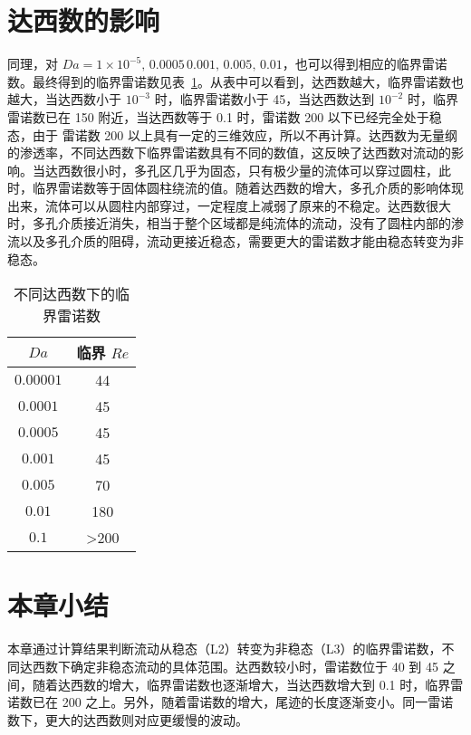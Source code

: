 \section{达西数的影响}\label{sec: Da}

同理，对 $Da=1\times 10^{-5},\,0.0005\,0.001,\,0.005,\,0.01$，也可以得到相应的临界雷诺数。最终得到的临界雷诺数见表~\ref{tab: critical Re}。从表中可以看到，达西数越大，临界雷诺数也越大，当达西数小于 $10^{-3}$ 时，临界雷诺数小于 45，当达西数达到 $10^{-2}$ 时，临界雷诺数已在 150 附近，当达西数等于 0.1 时，雷诺数 200 以下已经完全处于稳态，由于 雷诺数 200 以上具有一定的三维效应，所以不再计算。达西数为无量纲的渗透率，不同达西数下临界雷诺数具有不同的数值，这反映了达西数对流动的影响。当达西数很小时，多孔区几乎为固态，只有极少量的流体可以穿过圆柱，此时，临界雷诺数等于固体圆柱绕流的值。随着达西数的增大，多孔介质的影响体现出来，流体可以从圆柱内部穿过，一定程度上减弱了原来的不稳定。达西数很大时，多孔介质接近消失，相当于整个区域都是纯流体的流动，没有了圆柱内部的渗流以及多孔介质的阻碍，流动更接近稳态，需要更大的雷诺数才能由稳态转变为非稳态。

\begin{table}[h]
	\caption{不同达西数下的临界雷诺数}\label{tab: critical Re}
	\vspace{.5em}\centering\wuhao
	\begin{tabular}{cc}
		\toprule[1.5pt]
		$Da$ & 临界 $Re$ \\
		\midrule[1pt]
		$0.00001$ & 44 \\
		$0.0001$ & 45 \\
		$0.0005$ & 45 \\
		$0.001$  & 45 \\
		$0.005$  & 70 \\
		$0.01$   & 180 \\
		$0.1$    & >200 \\
	\bottomrule[1.5pt]
	\end{tabular}
\end{table}

\section{本章小结}

本章通过计算结果判断流动从稳态（L2）转变为非稳态（L3）的临界雷诺数，不同达西数下确定非稳态流动的具体范围。达西数较小时，雷诺数位于 40 到 45 之间，随着达西数的增大，临界雷诺数也逐渐增大，当达西数增大到 0.1 时，临界雷诺数已在 200 之上。另外，随着雷诺数的增大，尾迹的长度逐渐变小。同一雷诺数下，更大的达西数则对应更缓慢的波动。
